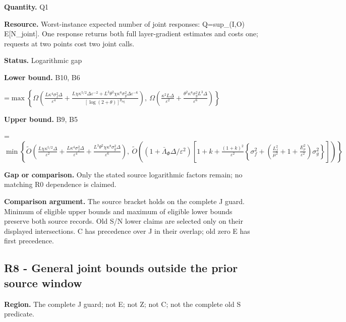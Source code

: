 \documentclass[10pt,a4paper]{article}
\newcommand{\AtlasMath}[1]{\par\begingroup\centering\setbox0=\hbox{$\displaystyle #1$}\ifdim\wd0>1.4\linewidth\typeout{ATLAS WIDE FORMULA: \the\wd0}\fi\ifdim\wd0>\linewidth\resizebox{\linewidth}{!}{\box0}\else\box0\fi\par\endgroup}
\begin{document}
\textbf{Quantity.} Q1



\textbf{Resource.} Worst-instance expected number of joint responses: Q=sup\_(I,O) E[N\_joint]. One response returns both full layer-gradient estimates and costs one; requests at two points cost two joint calls.



\textbf{Status.} Logarithmic gap



\textbf{Lower bound.} B10, B6



\AtlasMath{\max\left\{\Omega\!\left(\frac{L\kappa^4\sigma_f^2\Delta}{\varepsilon^4}+\frac{L\chi\kappa^{5/2}\Delta\varepsilon^{-2}+L^3\theta^2\chi\kappa^8\sigma_g^2\Delta\varepsilon^{-6}}{[\log(2+\theta)]^{p_{\log}}}\right),\ \Omega\!\left(\frac{\kappa^2L\Delta}{\varepsilon^2}+\frac{\theta^2\kappa^8\sigma_g^2L^3\Delta}{\varepsilon^6}\right)\right\}}


\textbf{Upper bound.} B9, B5



\AtlasMath{\min\left\{\widetilde O\!\left(\frac{L\chi\kappa^{5/2}\Delta}{\varepsilon^2}+\frac{L\kappa^4\sigma_f^2\Delta}{\varepsilon^4}+\frac{L^3\theta^2\chi\kappa^8\sigma_g^2\Delta}{\varepsilon^6}\right),\ \widetilde O\!\left((1+\bar\Lambda_\Phi\Delta/\varepsilon^2)\left[1+k+\frac{(1+k)^2}{\varepsilon^2}\left\{\sigma_f^2+\left(\frac{L_f^2}{\mu^2}+1+\frac{E_\rho^2}{\varepsilon^2}\right)\sigma_g^2\right\}\right]\right)\right\}}


\textbf{Gap or comparison.} Only the stated source logarithmic factors remain; no matching R0 dependence is claimed.



\textbf{Comparison argument.} The source bracket holds on the complete J guard. Minimum of eligible upper bounds and maximum of eligible lower bounds preserve both source records. Old S/N lower claims are selected only on their displayed intersections. C has precedence over J in their overlap; old zero E has first precedence.



\subsection{R8 - General joint bounds outside the prior source window}


\textbf{Region.} The complete J guard; not E; not Z; not C; not the complete old S predicate.
\end{document}
